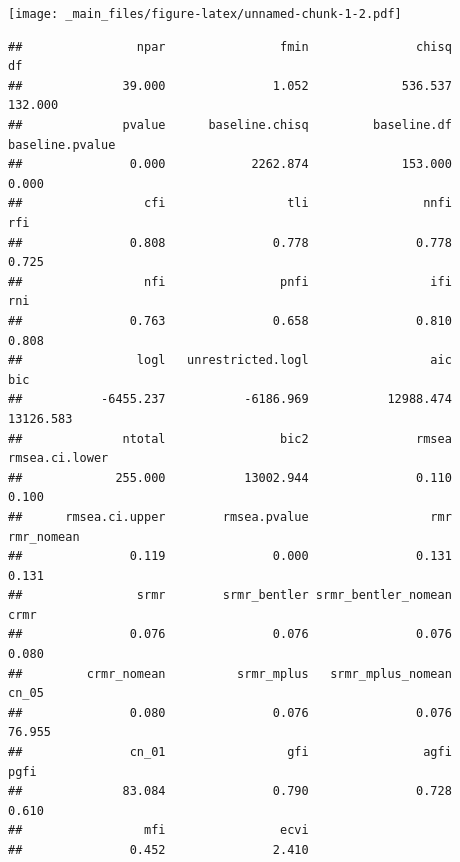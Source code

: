 \documentclass[
]{book}
\begin{document}
\texttt{[image: \_main\_files/figure-latex/unnamed-chunk-1-2.pdf]}

\begin{verbatim}
##                npar                fmin               chisq                  df 
##              39.000               1.052             536.537             132.000 
##              pvalue      baseline.chisq         baseline.df     baseline.pvalue 
##               0.000            2262.874             153.000               0.000 
##                 cfi                 tli                nnfi                 rfi 
##               0.808               0.778               0.778               0.725 
##                 nfi                pnfi                 ifi                 rni 
##               0.763               0.658               0.810               0.808 
##                logl   unrestricted.logl                 aic                 bic 
##           -6455.237           -6186.969           12988.474           13126.583 
##              ntotal                bic2               rmsea      rmsea.ci.lower 
##             255.000           13002.944               0.110               0.100 
##      rmsea.ci.upper        rmsea.pvalue                 rmr          rmr_nomean 
##               0.119               0.000               0.131               0.131 
##                srmr        srmr_bentler srmr_bentler_nomean                crmr 
##               0.076               0.076               0.076               0.080 
##         crmr_nomean          srmr_mplus   srmr_mplus_nomean               cn_05 
##               0.080               0.076               0.076              76.955 
##               cn_01                 gfi                agfi                pgfi 
##              83.084               0.790               0.728               0.610 
##                 mfi                ecvi 
##               0.452               2.410
\end{verbatim}
\end{document}
